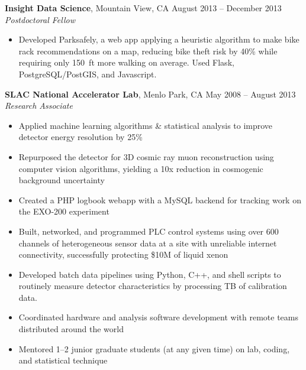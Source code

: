\documentclass[margin,line]{resume}
\begin{document}
\begin{resume}
    \textbf{Insight Data Science}, Mountain View, CA \hfill August 2013 -- December 2013\vspace{1mm}\\\vspace{1mm}%
    \textsl{Postdoctoral Fellow}
    \begin{itemize}
    \item Developed Parksafely, a web app applying a heuristic algorithm to make bike rack recommendations on a map, reducing bike theft risk by 40\% while requiring only 150~ft more walking on average. Used Flask, PostgreSQL/PostGIS, and Javascript.
    \end{itemize}

    \newpage

    \textbf{SLAC National Accelerator Lab}, Menlo Park, CA \hfill May 2008 -- August 2013\vspace{1mm}\\\vspace{1mm}%
    \textsl{Research Associate}
    \begin{itemize}
    \item Applied machine learning algorithms \& statistical analysis to improve detector energy resolution by 25\%
    \item Repurposed the detector for 3D cosmic ray muon reconstruction using computer vision algorithms, yielding a 10x reduction in cosmogenic background uncertainty
    \item Created a PHP logbook webapp with a MySQL backend for tracking work on the EXO-200 experiment
    \item Built, networked, and programmed PLC control systems using over 600 channels of heterogeneous sensor data at a site with unreliable internet connectivity, successfully protecting \$10M of liquid xenon
    \item Developed batch data pipelines using Python, C++, and shell scripts to routinely measure detector characteristics by processing TB of calibration data.
    \item Coordinated hardware and analysis software development with remote teams distributed around the world 
    \item Mentored 1--2 junior graduate students (at any given time) on lab, coding, and statistical technique
    \end{itemize}



\end{resume}
\end{document}

